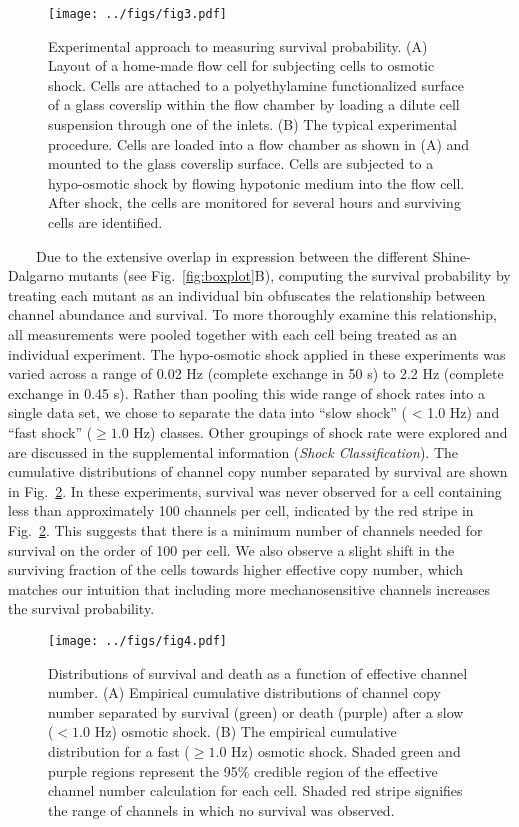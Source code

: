 \begin{figure}
\centering
\texttt{[image: ../figs/fig3.pdf]}
\caption{Experimental
approach
to
measuring
survival
probability.
(A)
Layout
of a
home-made
flow
cell
for
subjecting
cells
to
osmotic
shock.
Cells
are
attached
to a
polyethylamine
functionalized
surface
of a
glass
coverslip
within
the
flow
chamber
by
loading
a
dilute
cell
suspension
through
one of
the
inlets.
(B)
The
typical
experimental
procedure.
Cells
are
loaded
into a
flow
chamber
as
shown
in (A)
and
mounted
to the
glass
coverslip
surface.
Cells
are
subjected
to a
hypo-osmotic
shock
by
flowing
hypotonic
medium
into
the
flow
cell.
After
shock,
the
cells
are
monitored
for
several
hours
and
surviving
cells
are
identified.}\label{fig:flow_cell}
\end{figure}

~~~~Due
to the
extensive
overlap
in
expression
between
the
different
Shine-Dalgarno
mutants
(see
Fig.~\ref{fig:boxplot}B),
computing
the
survival
probability
by
treating
each
mutant
as an
individual
bin
obfuscates
the
relationship
between
channel
abundance
and
survival.
To
more
thoroughly
examine
this
relationship,
all
measurements
were
pooled
together
with
each
cell
being
treated
as an
individual
experiment.
The
hypo-osmotic
shock
applied
in
these
experiments
was
varied
across
a
range
of
0.02
Hz
(complete
exchange
in 50
s) to
2.2 Hz
(complete
exchange
in
0.45
s).
Rather
than
pooling
this
wide
range
of
shock
rates
into a
single
data
set,
we
chose
to
separate
the
data
into
``slow
shock''
(
\textless{}
1.0
Hz)
and
``fast
shock''
(\(\geq 1.0\)
Hz)
classes.
Other
groupings
of
shock
rate
were
explored
and
are
discussed
in the
supplemental
information
(\emph{Shock
Classification}).
The
cumulative
distributions
of
channel
copy
number
separated
by
survival
are
shown
in
Fig.~\ref{fig:survival_dists}.
In
these
experiments,
survival
was
never
observed
for a
cell
containing
less
than
approximately
100
channels
per
cell,
indicated
by the
red
stripe
in
Fig.~\ref{fig:survival_dists}.
This
suggests
that
there
is a
minimum
number
of
channels
needed
for
survival
on the
order
of 100
per
cell.
We
also
observe
a
slight
shift
in the
surviving
fraction
of the
cells
towards
higher
effective
copy
number,
which
matches
our
intuition
that
including
more
mechanosensitive
channels
increases
the
survival
probability.

\begin{figure}
\centering
\texttt{[image: ../figs/fig4.pdf]}
\caption{Distributions
of
survival
and
death
as a
function
of
effective
channel
number.
(A)
Empirical
cumulative
distributions
of
channel
copy
number
separated
by
survival
(green)
or
death
(purple)
after
a slow
(\(< 1.0\)
Hz)
osmotic
shock.
(B)
The
empirical
cumulative
distribution
for a
fast
(\(\geq 1.0\)
Hz)
osmotic
shock.
Shaded
green
and
purple
regions
represent
the
95\%
credible
region
of the
effective
channel
number
calculation
for
each
cell.
Shaded
red
stripe
signifies
the
range
of
channels
in
which
no
survival
was
observed.}\label{fig:survival_dists}
\end{figure}

